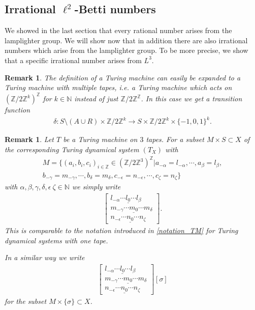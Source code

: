 \documentclass[12pt,a4paper]{scrartcl}
\theoremstyle{plain}
\newtheorem{Remark}[Theorem]{Remark}
\theoremstyle{definition}
\numberwithin{equation}{section}
\newcommand{\Z}{\mathbb{Z}} %
\newcommand{\N}{\mathbb{N}} %
\newcommand{\2}{\mathbb{Z} / 2 \mathbb{Z}}
\newcommand{\1}{\bar{1}}
\newcommand{\0}{\bar{0}}
\begin{document}
\subsection{Irrational $\ell^2$-Betti numbers}
We showed in the last section that every rational number arises from the lamplighter group. We will show now that in addition there are also irrational numbers which arise from the lamplighter group. To be more precise, we show that a specific irrational number arises from $L^3$.
\begin{Remark}
	The definition of a Turing machine can easily be expanded to a Turing machine with multiple tapes, i.e. a Turing machine which acts on $(\2^k)^\Z$ for $k \in \N$ instead of just $\2^\Z$. In this case we get a transition function 
	\begin{align*}
		\delta\colon S \setminus(A \cup R) \times \2^k \to S \times \2^k \times \{-1, 0, 1\}^k.
	\end{align*}
\end{Remark}
\begin{Remark}
	Let $T$ be a Turing machine on $3$ tapes. For a subset $M \times S \subset X$ of the corresponding Turing dynamical system $(T_X)$ with 
	\begin{align*}
		M = \{(a_i, b_i, c_i)_{i \in \Z} \in (\2^3)^\Z | a_{-\alpha} = l_{-\alpha}, \cdots, a_\beta = l_\beta,\\
		 b_{-\gamma} = m_{-\gamma}, \cdots, b_\delta = m_\delta, c_{-\epsilon} = n_{-\epsilon}, \cdots, c_\zeta = n_\zeta \}
	\end{align*}
	with $\alpha, \beta, \gamma, \delta, \epsilon\ \zeta \in \N$ we simply write
	\begin{align*}
		\begin{bmatrix}
			l_{-\alpha} \cdots \underline{l_0} \cdots l_\beta \\
			m_{-\gamma} \cdots \underline{m_0} \cdots m_\delta \\
			n_{-\epsilon} \cdots \underline{n_0} \cdots n_\zeta
		\end{bmatrix}.
	\end{align*}
	This is comparable to the notation introduced in \ref{notation_TM} for Turing dynamical systems with one tape.
	
	In a similar way we write 
	\begin{align*}
		\begin{bmatrix}
			l_{-\alpha} \cdots \underline{l_0} \cdots l_\beta \\
			m_{-\gamma} \cdots \underline{m_0} \cdots m_\delta \\
			n_{-\epsilon} \cdots \underline{n_0} \cdots n_\zeta
		\end{bmatrix}[\sigma]
	\end{align*}
	for the subset $M \times \{\sigma \} \subset X$.
\end{Remark}
\end{document}
